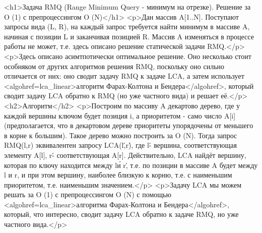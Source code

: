 <h1>Задача RMQ (Range Minimum Query - минимум на отрезке). Решение за O (1) с препроцессингом O (N)</h1>
<p>Дан массив A[1..N]. Поступают запросы вида (L, R), на каждый запрос требуется найти минимум в массиве A, начиная с позиции L и заканчивая позицией R. Массив A изменяться в процессе работы не может, т.е. здесь описано решение статической задачи RMQ.</p>
<p>Здесь описано асимтпотически оптимальное решение. Оно несколько стоит особняком от других алгоритмов решения RMQ, поскольку оно сильно отличается от них: оно сводит задачу RMQ к задаче LCA, а затем использует <algohref=lca_linear>алгоритм Фарах-Колтона и Бендера</algohref>, который сводит задачу LCA обратно к RMQ (но уже частного вида) и решает её.</p>
<h2>Алгоритм</h2>
<p>Построим по массиву A декартово дерево, где у каждой вершины ключом будет позиция i, а приоритетом - само число A[i] (предполагается, что в декартовом дереве приоритеты упорядочены от меньшего в корне к большим). Такое дерево можно построить за O (N). Тогда запрос RMQ(l,r) эквивалентен запросу LCA(l\',r\'), где l\' - вершина, соответствующая элементу A[l], r\' - соответствующая A[r]. Действительно, LCA найдёт вершину, которая по ключу находится между l\' и r\', т.е. по позиции в массиве A будет между l и r, и при этом вершину, наиболее близкую к корню, т.е. с наименьшим приоритетом, т.е. наименьшим значением.</p>
<p>Задачу LCA мы можем решать за O (1) с препроцессингом O (N) с помощью <algohref=lca_linear>алгоритма Фарах-Колтона и Бендера</algohref>, который, что интересно, сводит задачу LCA обратно к задаче RMQ, но уже частного вида.</p>